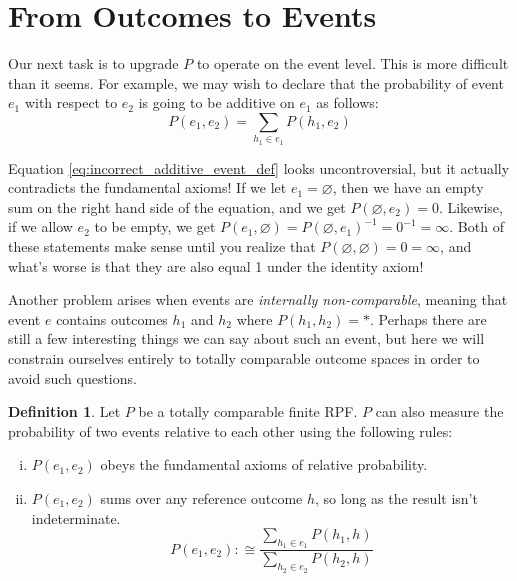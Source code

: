 \documentclass[twoside]{article}
\theoremstyle{plain}%
\theoremstyle{definition}
\newtheorem{definition}{Definition}[section]
\theoremstyle{remark}
\begin{document}
\section{From Outcomes to Events}

Our next task is to upgrade \(P\) to operate on the event level. This is more difficult than it seems. For example, we may wish to declare that the probability of event \(e_1\) with respect to \(e_2\) is going to be additive on \(e_1\) as follows:
\begin{equation}
\label{eq:incorrect_additive_event_def}
P(e_1, e_2) = \sum_{h_1 \in e_1}P(h_1, e_2)
\end{equation}

Equation \ref{eq:incorrect_additive_event_def} looks uncontroversial, but it actually contradicts the fundamental axioms! If we let \(e_1 = \varnothing\), then we have an empty sum on the right hand side of the equation, and we get \(P(\varnothing, e_2) = 0\). Likewise, if we allow \(e_2\) to be empty, we get \(P(e_1, \varnothing) = P(\varnothing, e_1)^{-1}=0^{-1}=\infty\). Both of these statements make sense until you realize that \(P(\varnothing, \varnothing) = 0 = \infty\), and what's worse is that they are also equal 1 under the identity axiom!

Another problem arises when events are \textit{internally non-comparable}, meaning that event \(e\) contains outcomes \(h_1\) and \(h_2\) where \(P(h_1, h_2) = \ast\). Perhaps there are still a few interesting things we can say about such an event, but here we will constrain ourselves entirely to totally comparable outcome spaces in order to avoid such questions.

\begin{definition}
Let \(P\) be a totally comparable finite RPF. \(P\) can also measure the probability of two events relative to each other using the following rules:

\begin{enumerate}[(i)]
  \item \label{event_def_1} \(P(e_1, e_2)\) obeys the fundamental axioms of relative probability.
  \item \label{event_def_2} \(P(e_1, e_2)\) sums over any reference outcome \(h\), so long as the result isn't indeterminate.
    \begin{equation}
      \label{eq:event_def_ratio_match}
      P(e_1, e_2) :\cong \frac{\sum_{h_1 \in e_1} P(h_1, h)}{\sum_{h_2 \in e_2} P(h_2, h)}
    \end{equation}
\end{enumerate}
\end{definition}
\end{document}
